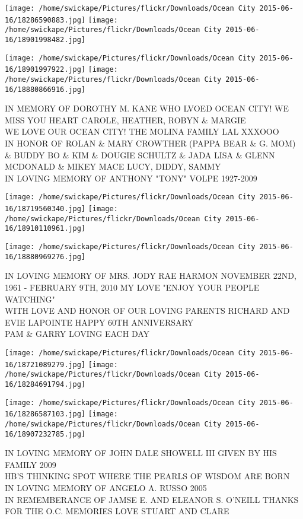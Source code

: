 \documentclass[10pt,letterpaper]{article}
\begin{document}
\texttt{[image: /home/swickape/Pictures/flickr/Downloads/Ocean City 2015-06-16/18286590883.jpg]}
\texttt{[image: /home/swickape/Pictures/flickr/Downloads/Ocean City 2015-06-16/18901998482.jpg]}

\texttt{[image: /home/swickape/Pictures/flickr/Downloads/Ocean City 2015-06-16/18901997922.jpg]}
\texttt{[image: /home/swickape/Pictures/flickr/Downloads/Ocean City 2015-06-16/18880866916.jpg]}

IN MEMORY OF DOROTHY M. KANE WHO LVOED OCEAN CITY!  WE MISS YOU HEART CAROLE, HEATHER, ROBYN \& MARGIE\\
WE LOVE OUR OCEAN CITY! THE MOLINA FAMILY LAL XXXOOO\\
IN HONOR OF ROLAN \& MARY CROWTHER (PAPPA BEAR \& G. MOM) \& BUDDY BO \& KIM \& DOUGIE SCHULTZ \& JADA LISA \& GLENN MCDONALD \& MIKEY MACE LUCY, DIDDY, SAMMY\\
IN LOVING MEMORY OF ANTHONY "TONY" VOLPE 1927{-}2009\\
\pagebreak

\texttt{[image: /home/swickape/Pictures/flickr/Downloads/Ocean City 2015-06-16/18719560340.jpg]}
\texttt{[image: /home/swickape/Pictures/flickr/Downloads/Ocean City 2015-06-16/18910110961.jpg]}

\vspace{0.25in}
\texttt{[image: /home/swickape/Pictures/flickr/Downloads/Ocean City 2015-06-16/18880969276.jpg]}

IN LOVING MEMORY OF MRS. JODY RAE HARMON NOVEMBER 22ND, 1961 {-} FEBRUARY 9TH, 2010 MY LOVE "ENJOY YOUR PEOPLE WATCHING"\\
WITH LOVE AND HONOR OF OUR LOVING PARENTS RICHARD AND EVIE LAPOINTE HAPPY 60TH ANNIVERSARY\\
PAM \& GARRY LOVING EACH DAY\\
\pagebreak

\texttt{[image: /home/swickape/Pictures/flickr/Downloads/Ocean City 2015-06-16/18721089279.jpg]}
\texttt{[image: /home/swickape/Pictures/flickr/Downloads/Ocean City 2015-06-16/18284691794.jpg]}

\texttt{[image: /home/swickape/Pictures/flickr/Downloads/Ocean City 2015-06-16/18286587103.jpg]}
\texttt{[image: /home/swickape/Pictures/flickr/Downloads/Ocean City 2015-06-16/18907232785.jpg]}

IN LOVING MEMORY OF JOHN DALE SHOWELL III GIVEN BY HIS FAMILY 2009\\
HB'S THINKING SPOT WHERE THE PEARLS OF WISDOM ARE BORN\\
IN LOVING MEMORY OF ANGELO A. RUSSO 2005\\
IN REMEMBERANCE OF JAMSE E. AND ELEANOR S. O'NEILL THANKS FOR THE O.C. MEMORIES LOVE STUART AND CLARE\\
\pagebreak
\end{document}
